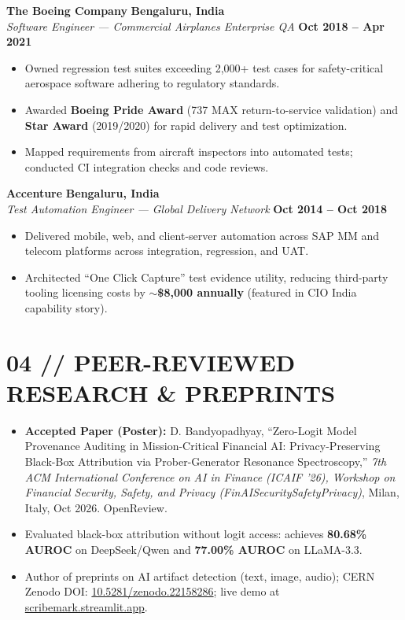 \documentclass[10pt,a4paper]{article}
\begin{document}
\vspace{1.5pt}
\noindent
\textbf{The Boeing Company} \hfill \textbf{Bengaluru, India}\\
\textit{Software Engineer --- Commercial Airplanes Enterprise QA} \hfill \textbf{Oct 2018 -- Apr 2021}
\begin{itemize}[leftmargin=*,noitemsep,topsep=1pt]
    \item Owned regression test suites exceeding 2,000+ test cases for safety-critical aerospace software adhering to regulatory standards.
    \item Awarded \textbf{Boeing Pride Award} (737 MAX return-to-service validation) and \textbf{Star Award} (2019/2020) for rapid delivery and test optimization.
    \item Mapped requirements from aircraft inspectors into automated tests; conducted CI integration checks and code reviews.
\end{itemize}

\vspace{1.5pt}
\noindent
\textbf{Accenture} \hfill \textbf{Bengaluru, India}\\
\textit{Test Automation Engineer --- Global Delivery Network} \hfill \textbf{Oct 2014 -- Oct 2018}
\begin{itemize}[leftmargin=*,noitemsep,topsep=1pt]
    \item Delivered mobile, web, and client-server automation across SAP MM and telecom platforms across integration, regression, and UAT.
    \item Architected ``One Click Capture'' test evidence utility, reducing third-party tooling licensing costs by \textbf{$\sim$\$8,000 annually} (featured in CIO India capability story).
\end{itemize}

\section*{04 // PEER-REVIEWED RESEARCH \& PREPRINTS}
\small
\begin{itemize}[leftmargin=*,noitemsep,topsep=1pt]
    \item \textbf{Accepted Paper (Poster):} D. Bandyopadhyay, ``Zero-Logit Model Provenance Auditing in Mission-Critical Financial AI: Privacy-Preserving Black-Box Attribution via Prober-Generator Resonance Spectroscopy,'' \textit{7th ACM International Conference on AI in Finance (ICAIF '26), Workshop on Financial Security, Safety, and Privacy (FinAISecuritySafetyPrivacy)}, Milan, Italy, Oct 2026. OpenReview.
    \item Evaluated black-box attribution without logit access: achieves \textbf{80.68\% AUROC} on DeepSeek/Qwen and \textbf{77.00\% AUROC} on LLaMA-3.3.
    \item Author of preprints on AI artifact detection (text, image, audio); CERN Zenodo DOI: \href{https://doi.org/10.5281/zenodo.22158286}{10.5281/zenodo.22158286}; live demo at \href{https://scribemark.streamlit.app/}{scribemark.streamlit.app}.
\end{itemize}
\end{document}
